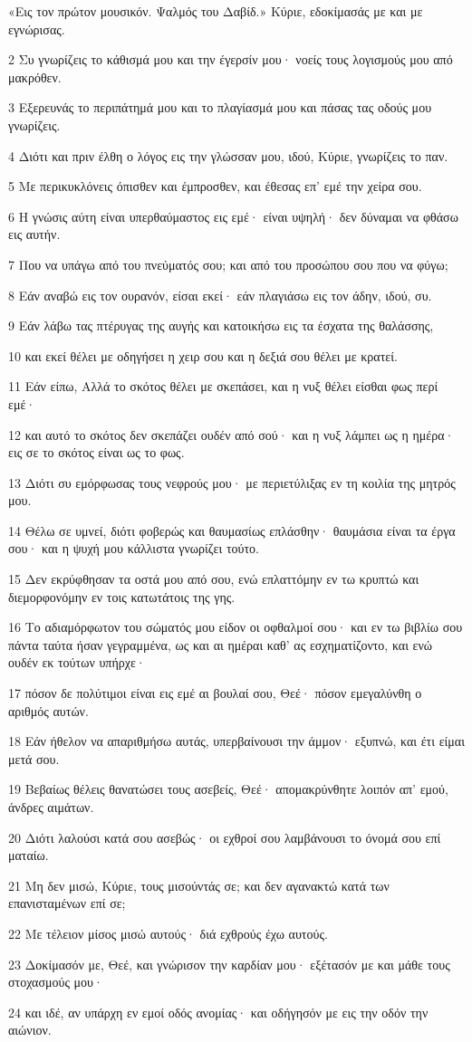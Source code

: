 \par «Εις τον πρώτον μουσικόν. Ψαλμός του Δαβίδ.» Κύριε, εδοκίμασάς με και με εγνώρισας.
\par 2 Συ γνωρίζεις το κάθισμά μου και την έγερσίν μου· νοείς τους λογισμούς μου από μακρόθεν.
\par 3 Εξερευνάς το περιπάτημά μου και το πλαγίασμά μου και πάσας τας οδούς μου γνωρίζεις.
\par 4 Διότι και πριν έλθη ο λόγος εις την γλώσσαν μου, ιδού, Κύριε, γνωρίζεις το παν.
\par 5 Με περικυκλόνεις όπισθεν και έμπροσθεν, και έθεσας επ' εμέ την χείρα σου.
\par 6 Η γνώσις αύτη είναι υπερθαύμαστος εις εμέ· είναι υψηλή· δεν δύναμαι να φθάσω εις αυτήν.
\par 7 Που να υπάγω από του πνεύματός σου; και από του προσώπου σου που να φύγω;
\par 8 Εάν αναβώ εις τον ουρανόν, είσαι εκεί· εάν πλαγιάσω εις τον άδην, ιδού, συ.
\par 9 Εάν λάβω τας πτέρυγας της αυγής και κατοικήσω εις τα έσχατα της θαλάσσης,
\par 10 και εκεί θέλει με οδηγήσει η χειρ σου και η δεξιά σου θέλει με κρατεί.
\par 11 Εάν είπω, Αλλά το σκότος θέλει με σκεπάσει, και η νυξ θέλει είσθαι φως περί εμέ·
\par 12 και αυτό το σκότος δεν σκεπάζει ουδέν από σού· και η νυξ λάμπει ως η ημέρα· εις σε το σκότος είναι ως το φως.
\par 13 Διότι συ εμόρφωσας τους νεφρούς μου· με περιετύλιξας εν τη κοιλία της μητρός μου.
\par 14 Θέλω σε υμνεί, διότι φοβερώς και θαυμασίως επλάσθην· θαυμάσια είναι τα έργα σου· και η ψυχή μου κάλλιστα γνωρίζει τούτο.
\par 15 Δεν εκρύφθησαν τα οστά μου από σου, ενώ επλαττόμην εν τω κρυπτώ και διεμορφονόμην εν τοις κατωτάτοις της γης.
\par 16 Το αδιαμόρφωτον του σώματός μου είδον οι οφθαλμοί σου· και εν τω βιβλίω σου πάντα ταύτα ήσαν γεγραμμένα, ως και αι ημέραι καθ' ας εσχηματίζοντο, και ενώ ουδέν εκ τούτων υπήρχε·
\par 17 πόσον δε πολύτιμοι είναι εις εμέ αι βουλαί σου, Θεέ· πόσον εμεγαλύνθη ο αριθμός αυτών.
\par 18 Εάν ήθελον να απαριθμήσω αυτάς, υπερβαίνουσι την άμμον· εξυπνώ, και έτι είμαι μετά σου.
\par 19 Βεβαίως θέλεις θανατώσει τους ασεβείς, Θεέ· απομακρύνθητε λοιπόν απ' εμού, άνδρες αιμάτων.
\par 20 Διότι λαλούσι κατά σου ασεβώς· οι εχθροί σου λαμβάνουσι το όνομά σου επί ματαίω.
\par 21 Μη δεν μισώ, Κύριε, τους μισούντάς σε; και δεν αγανακτώ κατά των επανισταμένων επί σε;
\par 22 Με τέλειον μίσος μισώ αυτούς· διά εχθρούς έχω αυτούς.
\par 23 Δοκίμασόν με, Θεέ, και γνώρισον την καρδίαν μου· εξέτασόν με και μάθε τους στοχασμούς μου·
\par 24 και ιδέ, αν υπάρχη εν εμοί οδός ανομίας· και οδήγησόν με εις την οδόν την αιώνιον.

